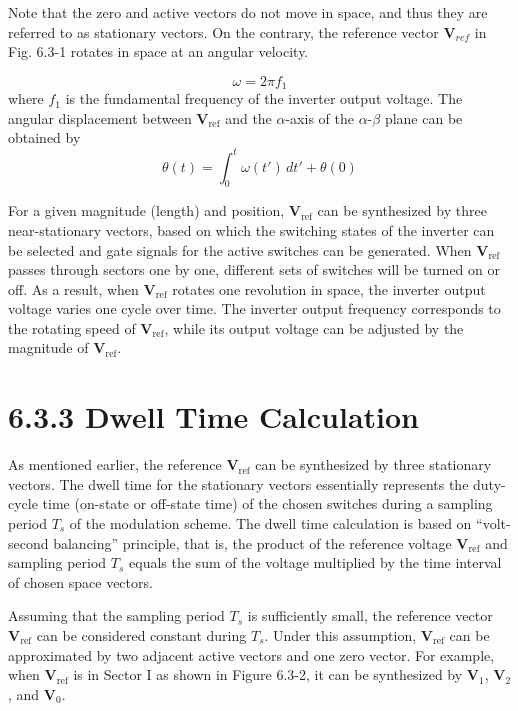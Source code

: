 \documentclass[letterpaper,12pt]{article}
\begin{document}
Note that the zero and active vectors do not move in space, and thus they are referred to as stationary vectors. On the contrary, the reference vector $\mathbf{V}_{ref}$ in Fig. 6.3-1 rotates in space at an angular velocity.

\[
\omega = 2\pi f_1 \tag{6.3-8}
\]
where \( f_1 \) is the fundamental frequency of the inverter output voltage. The angular displacement between \( \mathbf{V}_{\text{ref}} \) and the \(\alpha\)-axis of the \(\alpha\)-\(\beta\) plane can be obtained by
\[
\theta(t) = \int_0^t \omega(t') \, dt' + \theta(0) \tag{6.3-9}
\]

For a given magnitude (length) and position, \( \mathbf{V}_{\text{ref}} \) can be synthesized by three near-stationary vectors, based on which the switching states of the inverter can be selected and gate signals for the active switches can be generated. When \( \mathbf{V}_{\text{ref}} \) passes through sectors one by one, different sets of switches will be turned on or off. As a result, when \( \mathbf{V}_{\text{ref}} \) rotates one revolution in space, the inverter output voltage varies one cycle over time. The inverter output frequency corresponds to the rotating speed of \( \mathbf{V}_{\text{ref}} \), while its output voltage can be adjusted by the magnitude of \( \mathbf{V}_{\text{ref}} \).

\section*{6.3.3 Dwell Time Calculation}

As mentioned earlier, the reference $\mathbf{V}_{\text{ref}}$ can be synthesized by three stationary vectors. The dwell time for the stationary vectors essentially represents the duty-cycle time (on-state or off-state time) of the chosen switches during a sampling period $T_s$ of the modulation scheme. The dwell time calculation is based on ``volt-second balancing'' principle, that is, the product of the reference voltage $\mathbf{V}_{\text{ref}}$ and sampling period $T_s$ equals the sum of the voltage multiplied by the time interval of chosen space vectors.

Assuming that the sampling period $T_s$ is sufficiently small, the reference vector $\mathbf{V}_{\text{ref}}$ can be considered constant during $T_s$. Under this assumption, $\mathbf{V}_{\text{ref}}$ can be approximated by two adjacent active vectors and one zero vector. For example, when $\mathbf{V}_{\text{ref}}$ is in Sector I as shown in Figure 6.3-2, it can be synthesized by $\mathbf{V}_1$, $\mathbf{V}_2$, and $\mathbf{V}_0$.
\end{document}
